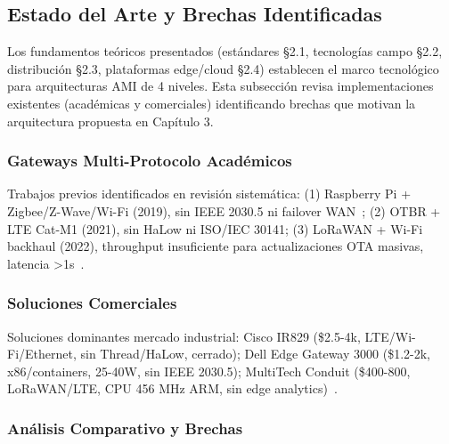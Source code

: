 \subsection{Estado del Arte y Brechas Identificadas}

Los fundamentos teóricos presentados (estándares §2.1, tecnologías campo §2.2, distribución §2.3, plataformas edge/cloud §2.4) establecen el marco tecnológico para arquitecturas AMI de 4 niveles. Esta subsección revisa implementaciones existentes (académicas y comerciales) identificando brechas que motivan la arquitectura propuesta en Capítulo 3.

\subsubsection{Gateways Multi-Protocolo Académicos}

Trabajos previos identificados en revisión sistemática: (1) Raspberry Pi + Zigbee/Z-Wave/Wi-Fi (2019), sin IEEE 2030.5 ni failover WAN~\cite{boonmeerukCostEffectiveIIoTGateway2024}; (2) OTBR + LTE Cat-M1 (2021), sin HaLow ni ISO/IEC 30141; (3) LoRaWAN + Wi-Fi backhaul (2022), throughput insuficiente para actualizaciones OTA masivas, latencia >1s~\cite{halowVsLoRaWANComparison2023}.

\subsubsection{Soluciones Comerciales}

Soluciones dominantes mercado industrial: Cisco IR829 (\$2.5-4k, LTE/Wi-Fi/Ethernet, sin Thread/HaLow, cerrado); Dell Edge Gateway 3000 (\$1.2-2k, x86/containers, 25-40W, sin IEEE 2030.5); MultiTech Conduit (\$400-800, LoRaWAN/LTE, CPU 456 MHz ARM, sin edge analytics)~\cite{boonmeerukCostEffectiveIIoTGateway2024}.

\subsubsection{Análisis Comparativo y Brechas}

